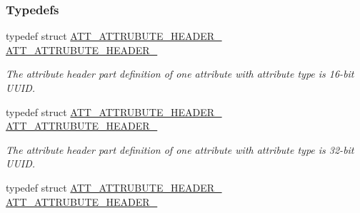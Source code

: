 \subsubsection*{Typedefs}
\begin{DoxyCompactItemize}
\item 
typedef struct \hyperlink{struct_a_t_t___a_t_t_r_u_b_u_t_e___h_e_a_d_e_r__2}{A\+T\+T\+\_\+\+A\+T\+T\+R\+U\+B\+U\+T\+E\+\_\+\+H\+E\+A\+D\+E\+R\+\_} \hyperlink{group___b_l_e___g_a_t_t___s_e_r_v_i_c_e___t_a_b_l_e_ga73a6aa7898d56a30ade4bda8f7b3a364}{A\+T\+T\+\_\+\+A\+T\+T\+R\+U\+B\+U\+T\+E\+\_\+\+H\+E\+A\+D\+E\+R\+\_}\hypertarget{group___b_l_e___g_a_t_t___s_e_r_v_i_c_e___t_a_b_l_e_ga73a6aa7898d56a30ade4bda8f7b3a364}{}\label{group___b_l_e___g_a_t_t___s_e_r_v_i_c_e___t_a_b_l_e_ga73a6aa7898d56a30ade4bda8f7b3a364}

\begin{DoxyCompactList}\small\item\em The attribute header part definition of one attribute with attribute type is 16-\/bit U\+U\+ID. \end{DoxyCompactList}\item 
typedef struct \hyperlink{struct_a_t_t___a_t_t_r_u_b_u_t_e___h_e_a_d_e_r__4}{A\+T\+T\+\_\+\+A\+T\+T\+R\+U\+B\+U\+T\+E\+\_\+\+H\+E\+A\+D\+E\+R\+\_} \hyperlink{group___b_l_e___g_a_t_t___s_e_r_v_i_c_e___t_a_b_l_e_gac31afff05aa4822b78c008d87890b041}{A\+T\+T\+\_\+\+A\+T\+T\+R\+U\+B\+U\+T\+E\+\_\+\+H\+E\+A\+D\+E\+R\+\_}\hypertarget{group___b_l_e___g_a_t_t___s_e_r_v_i_c_e___t_a_b_l_e_gac31afff05aa4822b78c008d87890b041}{}\label{group___b_l_e___g_a_t_t___s_e_r_v_i_c_e___t_a_b_l_e_gac31afff05aa4822b78c008d87890b041}

\begin{DoxyCompactList}\small\item\em The attribute header part definition of one attribute with attribute type is 32-\/bit U\+U\+ID. \end{DoxyCompactList}\item 
typedef struct \hyperlink{struct_a_t_t___a_t_t_r_u_b_u_t_e___h_e_a_d_e_r__16}{A\+T\+T\+\_\+\+A\+T\+T\+R\+U\+B\+U\+T\+E\+\_\+\+H\+E\+A\+D\+E\+R\+\_} \hyperlink{group___b_l_e___g_a_t_t___s_e_r_v_i_c_e___t_a_b_l_e_ga45c97946c3b0df7a9cc8848a6ef5f37a}{A\+T\+T\+\_\+\+A\+T\+T\+R\+U\+B\+U\+T\+E\+\_\+\+H\+E\+A\+D\+E\+R\+\_}\hypertarget{group___b_l_e___g_a_t_t___s_e_r_v_i_c_e___t_a_b_l_e_ga45c97946c3b0df7a9cc8848a6ef5f37a}{}\label{group___b_l_e___g_a_t_t___s_e_r_v_i_c_e___t_a_b_l_e_ga45c97946c3b0df7a9cc8848a6ef5f37a}


\end{DoxyCompactItemize}
